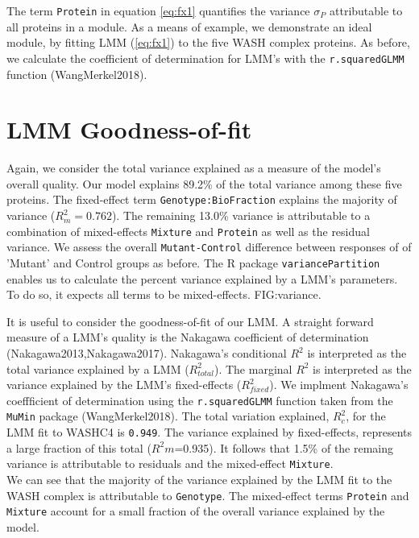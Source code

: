 \documentclass[11pt]{elife}\usepackage[]{graphicx}\usepackage[]{color}
\begin{document}
The term \texttt{Protein} in equation \ref{eq:fx1} quantifies the variance
$\sigma_P$ attributable to all proteins in a module.  As a means of example, we
demonstrate an ideal module, by fitting LMM (\ref{eq:fx1}) to the five WASH
complex proteins.  As before, we calculate the coefficient of determination for
LMM's with the \texttt{r.squaredGLMM} function (WangMerkel2018).\\


\section{LMM Goodness-of-fit}

Again, we consider the total variance explained as a measure of the model's
overall quality. Our model explains 89.2\% of the total variance among these
five proteins. The fixed-effect term \texttt{Genotype:BioFraction} explains the
majority of variance ($R^2_m=0.762$). The remaining 13.0\% variance is
attributable to a combination of mixed-effects \texttt{Mixture} and
\texttt{Protein} as well as the residual variance. We assess the overall
\texttt{Mutant-Control} difference between responses of of 'Mutant' and Control
groups as before. The R package \texttt{variancePartition} enables us to
calculate the percent variance explained by a LMM's parameters. To do so, it
expects all terms to be mixed-effects. FIG:variance.

It is useful to consider the goodness-of-fit of our LMM. A straight forward
measure of a LMM's quality is the Nakagawa coefficient of 
determination (Nakagawa2013,Nakagawa2017). Nakagawa's conditional $R^2$ is 
interpreted as the total variance explained by a LMM ($R^2_{total}$).
The marginal $R^2$ is interpreted as the variance explained by the LMM's 
fixed-effects ($R^2_{fixed}$). We implment Nakagawa's coeffficient of 
determination using the \texttt{r.squaredGLMM} function taken from the 
\texttt{MuMin} package (WangMerkel2018).
The total variation explained, $R^2_{c}$, for the LMM fit to WASHC4 is 
\texttt{0.949}. The variance explained by fixed-effects, represents a large
fraction of this total ($R^2{m}$=0.935). It follows that 1.5\% of the remaing
variance is attributable to residuals and the mixed-effect \texttt{Mixture}.\\

We can see that the majority of the variance explained by the LMM fit to the
WASH complex is attributable to \texttt{Genotype}. The mixed-effect terms
\texttt{Protein} and \texttt{Mixture} account for a small fraction of the 
overall variance explained by the model.
\end{document}
